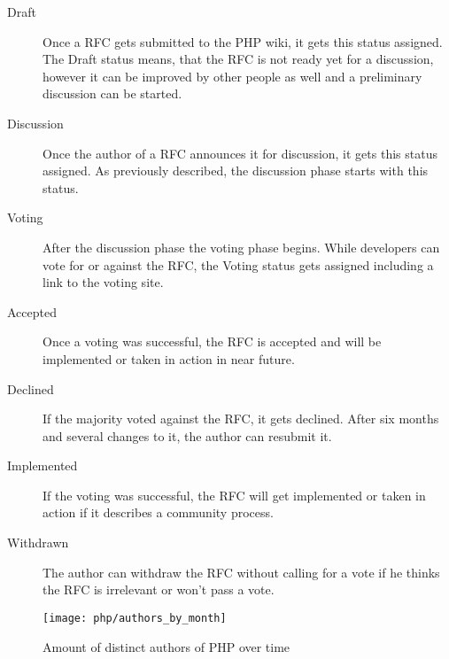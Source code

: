 \begin{description}

  \item[Draft] Once a \ac{RFC} gets submitted to the PHP wiki, it gets this
    status assigned. The Draft status means, that the \ac{RFC} is not ready yet
    for a discussion, however it can be improved by other people as well and a
    preliminary discussion can be started.

  \item[Discussion] Once the author of a \ac{RFC} announces it for discussion,
    it gets this status assigned. As previously described, the discussion phase
    starts with this status.

  \item[Voting] After the discussion phase the voting phase begins. While
    developers can vote for or against the \ac{RFC}, the Voting status gets
    assigned including a link to the voting site.

  \item[Accepted] Once a voting was successful, the \ac{RFC} is accepted and
    will be implemented or taken in action in near future.

  \item[Declined] If the majority voted against the \ac{RFC}, it gets declined.
    After six months and several changes to it, the author can resubmit it.

  \item[Implemented] If the voting was successful, the \ac{RFC} will get
    implemented or taken in action if it describes a community process.

  \item[Withdrawn] The author can withdraw the \ac{RFC} without calling for a
    vote if he thinks the \ac{RFC} is irrelevant or won't pass a vote.

\end{description}

\begin{figure}[htbp]
  \centering
  \texttt{[image: php/authors\_by\_month]}
  \caption{Amount of distinct authors of PHP over time}
\end{figure}


